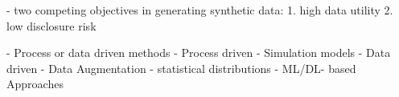 






- two competing objectives in generating synthetic data: \cite{little2021GenerativeAdversarialNetworksa}
    1. high data utility \cite{little2021GenerativeAdversarialNetworksa}
    2. low disclosure risk \cite{little2021GenerativeAdversarialNetworksa}



    - Process or data driven methods \cite{goncalves2020GenerationEvaluationSynthetic}
    - Process driven
        - Simulation models \cite{kowalczyk2022TaxonomyUseSynthetic}
    - Data driven
        - Data Augmentation \cite{kowalczyk2022TaxonomyUseSynthetic}
        - statistical distributions \cite{kowalczyk2022TaxonomyUseSynthetic}
        - ML/DL- based Approaches \cite{kowalczyk2022TaxonomyUseSynthetic}

